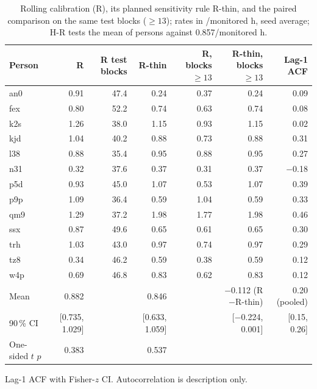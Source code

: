 \begin{table}[htbp]
\centering
\scriptsize\setlength{\tabcolsep}{3.5pt}
\caption{Rolling calibration (R), its planned sensitivity rule R-thin, and the paired comparison on the same test blocks ($\geq 13$); rates in /monitored h, seed average; H-R tests the mean of persons against 0.857/monitored h.}\label{tab:hr}
\begin{tabular}{lrrrrrr}
\toprule
Person & R & R test blocks & R-thin & R, blocks $\geq 13$ & R-thin, blocks $\geq 13$ & Lag-1 ACF \\
\midrule
an0 & 0.91 & 47.4 & 0.24 & 0.37 & 0.24 & 0.09 \\
fex & 0.80 & 52.2 & 0.74 & 0.63 & 0.74 & 0.08 \\
k2s & 1.26 & 38.0 & 1.15 & 0.93 & 1.15 & 0.02 \\
kjd & 1.04 & 40.2 & 0.88 & 0.73 & 0.88 & 0.31 \\
l38 & 0.88 & 35.4 & 0.95 & 0.88 & 0.95 & 0.27 \\
n31 & 0.32 & 37.6 & 0.37 & 0.31 & 0.37 & $-$0.18 \\
p5d & 0.93 & 45.0 & 1.07 & 0.53 & 1.07 & 0.39 \\
p9p & 1.09 & 36.4 & 0.59 & 1.04 & 0.59 & 0.33 \\
qm9 & 1.29 & 37.2 & 1.98 & 1.77 & 1.98 & 0.46 \\
ssx & 0.87 & 49.6 & 0.65 & 0.61 & 0.65 & 0.30 \\
trh & 1.03 & 43.0 & 0.97 & 0.74 & 0.97 & 0.29 \\
tz8 & 0.34 & 46.2 & 0.59 & 0.38 & 0.59 & 0.12 \\
w4p & 0.69 & 46.8 & 0.83 & 0.62 & 0.83 & 0.12 \\
\midrule Mean & 0.882 &  & 0.846 &  & $-$0.112 (R$-$R-thin) & 0.20 (pooled) \\
90\,\% CI & [0.735, 1.029] &  & [0.633, 1.059] &  & [$-$0.224, 0.001] & [0.15, 0.26] \\
One-sided $t$ $p$ & 0.383 &  & 0.537 &  &  &  \\
\bottomrule
\end{tabular}
\par\smallskip\begin{minipage}{0.95\linewidth}\scriptsize {} Lag-1 ACF with Fisher-$z$ CI. Autocorrelation is description only.\end{minipage}
\end{table}
